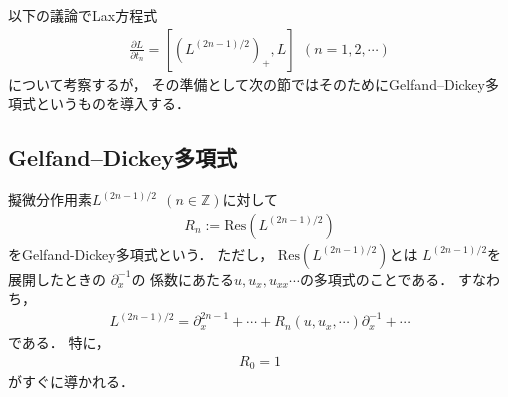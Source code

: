 \documentclass[dvipdfmx,12pt,a4paper,uplatex]{jsarticle}
\theoremstyle{plain}
\theoremstyle{definition}
\begin{document}
以下の議論でLax方程式
\begin{align}
\frac{\partial L}{\partial t_n} = 
\left[\left(L^{(2n-1)/2}\right)_+,L\right] \ \ (n=1,2,\cdots)
\end{align}
について考察するが，
その準備として次の節ではそのためにGelfand--Dickey多項式というものを導入する．

\subsection{Gelfand--Dickey多項式}
擬微分作用素$L^{(2n-1)/2} \ \ (n\in\mathbb Z)$に対して
\begin{align}
R_n := \mathrm{Res}(L^{(2n-1)/2})
\end{align}
をGelfand-Dickey多項式という．
ただし，
$\mathrm{Res}(L^{(2n-1)/2})$とは
$L^{(2n-1)/2}$を展開したときの
$\partial_x^{-1}$の
係数にあたる$u,u_x,u_{xx}\cdots$の多項式のことである．
すなわち，
\begin{align}
L^{(2n-1)/2}  =
\partial_x^{2n-1}+\cdots+R_n(u,u_x,\cdots)\partial_x^{-1} + \cdots
\end{align}
である．
特に，
\begin{align}
R_0 = 1
\end{align}
がすぐに導かれる．
\end{document}
